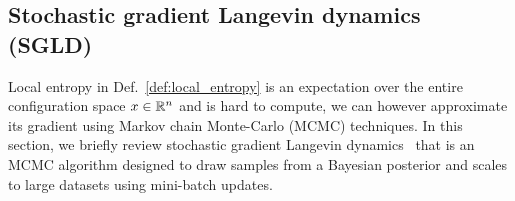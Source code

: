 \documentclass[10pt]{article}
\begin{document}
\begin{appendices}

\renewcommand\thetable{\thesection\arabic{table}}
\renewcommand\thefigure{\thesection\arabic{figure}}

\section{Stochastic gradient Langevin dynamics (SGLD)}
\label{s:app:langevin}

Local entropy in Def.~\eqref{def:local_entropy} is an expectation over the entire configuration space $x \in \mathbb{R}^n$ and is hard to compute, we can however approximate its gradient using Markov chain Monte-Carlo (MCMC) techniques. In this section, we briefly review stochastic gradient Langevin dynamics~\citep{welling2011bayesian} that is an MCMC algorithm designed to draw samples from a Bayesian posterior and scales to large datasets using mini-batch updates.


\end{appendices}
\end{document}

